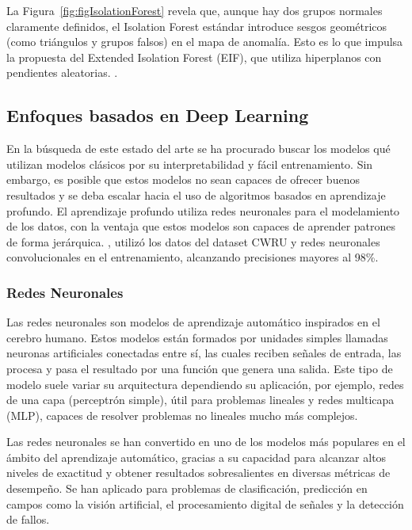 \documentclass[11pt,a4paper,spanish]{book}
\numberwithin{equation}{chapter}
\numberwithin{figure}{chapter}
\begin{document}
La Figura~\ref{fig:figIsolationForest} revela que, aunque hay dos grupos normales claramente definidos, el Isolation Forest estándar introduce sesgos geométricos (como triángulos y grupos falsos) en el mapa de anomalía. Esto es lo que impulsa la propuesta del Extended Isolation Forest (EIF), que utiliza hiperplanos con pendientes aleatorias. \cite{liu2021isoletionforest}.


\subsection{Enfoques basados en Deep Learning}

En la búsqueda de este estado del arte se ha procurado buscar los modelos qué utilizan modelos clásicos por su interpretabilidad y fácil entrenamiento. Sin embargo, es posible que estos modelos no sean capaces de ofrecer buenos resultados y se deba escalar hacia el uso de algoritmos basados en aprendizaje profundo. El aprendizaje profundo utiliza redes neuronales para el modelamiento de los datos, con la ventaja que estos modelos son capaces de aprender patrones de forma jerárquica. \cite{raj2024bearing}, utilizó los datos del dataset CWRU y redes neuronales convolucionales en el entrenamiento, alcanzando precisiones mayores al 98\%.


\subsubsection{Redes Neuronales}

Las redes neuronales son modelos de aprendizaje automático inspirados en el cerebro humano. Estos modelos están formados por unidades simples llamadas neuronas artificiales conectadas entre sí, las cuales reciben señales de entrada, las procesa y pasa el resultado por una función que genera una salida. Este tipo de modelo suele variar su arquitectura dependiendo su aplicación, por ejemplo, redes de una capa (perceptrón simple), útil para problemas lineales y redes multicapa (MLP), capaces de resolver problemas no lineales mucho más complejos.


Las redes neuronales se han convertido en uno de los modelos más populares en el ámbito del aprendizaje automático, gracias a su capacidad para alcanzar altos niveles de exactitud y obtener resultados sobresalientes en diversas métricas de desempeño. Se han aplicado para problemas de clasificación, predicción en campos como la visión artificial, el procesamiento digital de señales y la detección de fallos. 
\end{document}
